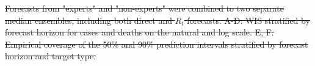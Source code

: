 \documentclass[10pt,a4paper,twocolumn]{article}
\providecommand{\DIFdeltex}[1]{{\protect\color{red}\sout{#1}}}                      %
\providecommand{\DIFdelbegin}{} %
\providecommand{\DIFdelend}{} %
\providecommand{\DIFdelFL}[1]{\DIFdel{#1}} %
\providecommand{\DIFdel}[1]{\texorpdfstring{\DIFdeltex{#1}}{}} %
\begin{document}
\DIFdelbegin %
{%
\DIFdelFL{Forecasts from "experts" and "non-experts" were combined to two separate median ensembles, including both direct and $R_t$ forecasts. A-D: WIS stratified by forecast horizon for cases and deaths on the natural and log scale. E, F: Empirical coverage of the 50\% and 90\% prediction intervals stratified by forecast horizon and target type.}}
\DIFdelend %


\DIFdelbegin %
\DIFdelend %


\DIFdelbegin %
\DIFdelend %




\end{document}
